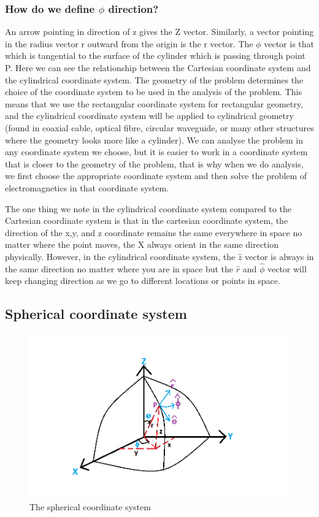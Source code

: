 \subsubsection*{ How do we define $\phi$ direction?} 
An arrow pointing in direction of z gives the Z vector. Similarly, a vector pointing in the radius vector r outward from the origin is the r vector. The $\phi$ vector is that which is tangential to the surface of the cylinder which is passing through point P. Here we can see the relationship between the Cartesian coordinate system and the cylindrical coordinate system. The geometry of the problem determines the choice of the coordinate system to be used in the analysis of the problem. This means that we use the rectangular coordinate system for rectangular geometry, and the cylindrical coordinate system will be applied to cylindrical geometry (found in coaxial cable, optical fibre, circular waveguide, or many other structures where the geometry looks more like a cylinder).  We can analyse the problem in any coordinate system we choose, but it is easier to work in a coordinate system that is closer to the geometry of the problem, that is why when we do analysis, we first choose the appropriate coordinate system and then solve the problem of electromagnetics in that coordinate system.

The one thing we note in the cylindrical coordinate system compared to the Cartesian coordinate system is that in the cartesian coordinate system, the direction of the x,y, and z coordinate remains the same everywhere in space no matter where the point moves, the X always orient in the same direction physically. However, in the cylindrical coordinate system, the $\hat{z}$ vector is always in the same direction no matter where you are in space but the $\hat{r}$ and $\hat{\phi}$ vector will keep changing direction as we go to different locations or points in space.

\subsection{Spherical coordinate system}
\begin{figure}[h]
\centering
\includegraphics[width=1\linewidth]{./graphics/spherical}
\caption{The spherical  coordinate system}
\end{figure}

